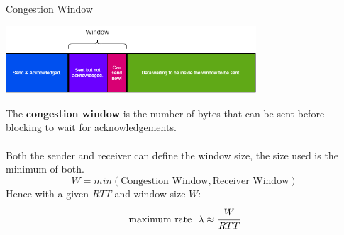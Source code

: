 \begin{definitionbox}{Congestion Window}
    \begin{center}\includegraphics[width=0.7\textwidth]{transport_layer/images/TCP congestion window.png}\end{center}
    The \textbf{congestion window} is the number of bytes that can be sent before blocking to wait for acknowledgements.
    \\
    \\ Both the sender and receiver can define the window size, the size used is the minimum of both.
    \[W = min(\text{Congestion Window}, \text{Receiver Window})\]
    Hence with a given $RTT$ and window size $W$:
    \[\text{maximum rate } \ \lambda \approx \cfrac{W}{RTT}\]
\end{definitionbox}

